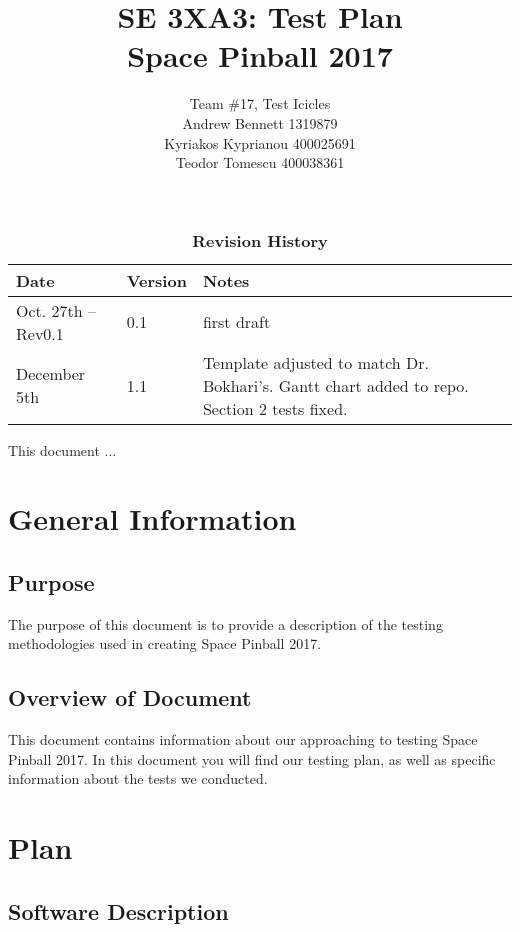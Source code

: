 \documentclass[12pt, titlepage]{article}
\title{SE 3XA3: Test Plan\\Space Pinball 2017}
\author{Team \#17, Test Icicles
		\\ Andrew Bennett 1319879
		\\ Kyriakos Kyprianou 400025691
		\\ Teodor Tomescu 400038361
}
\date{}
\begin{document}
\maketitle

\tableofcontents
\listoftables

\begin{table}[bp]
\caption{\bf Revision History}
\begin{tabularx}{\textwidth}{p{3cm}p{2cm}X}
\toprule {\bf Date} & {\bf Version} & {\bf Notes}\\
\midrule
Oct. 27th -- Rev0.1 	& 0.1 & first draft \\
December 5th & 1.1 & Template adjusted to match Dr. Bokhari's. Gantt chart added to repo. Section 2 tests fixed.\\
\bottomrule
\end{tabularx}
\end{table}

\newpage


This document ...

\section{General Information}

\subsection{Purpose}

The purpose of this document is to provide a description of the testing methodologies used in creating Space Pinball 2017. 

\subsection{Overview of Document}

This document contains information about our approaching to testing Space Pinball 2017. In this document you will find our testing plan, as well as specific information about the tests we conducted.

\section{Plan}
	
\subsection{Software Description}
\end{document}
